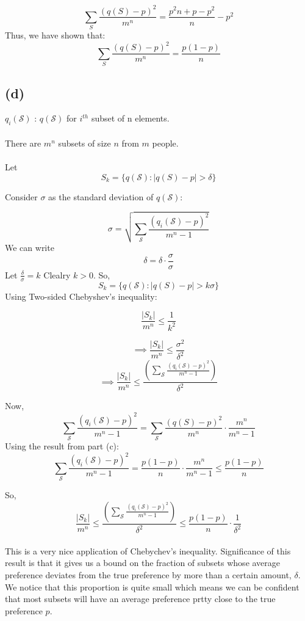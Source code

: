 \documentclass{report}
\begin{document}
\[\sum_{S} \frac{\left(q(S) - p\right)^{2}}{m^{n}} = \frac{p^2n + p -p^2}{n} - p^2\]
Thus, we have shown that:
\[\sum_{S} \frac{\left(q(S) - p\right)^{2}}{m^{n}} = \frac{p(1-p)}{n}\]

\subsection*{(d)}
\(q_i(\mathcal{S})\) : \(q(\mathcal{S})\) for \(i^{th}\) subset of n elements.
\\\\
There are \(m^n\) subsets of size \(n\) from \(m\) people.
\\\\
Let 
\[S_k = \{q(\mathcal{S})  : |q(S)-p| > \delta \}\]

Consider $\sigma$ as the standard deviation of \(q(\mathcal{S})\):

\[\sigma = \sqrt{\sum_{\mathcal{S}} \frac{(q_i(\mathcal{S}) - p)^{2}}{m^{n}-1}}\]
We can write 
\[\delta = \delta \cdot \frac{\sigma}{\sigma}\]
Let \(\frac{\delta}{\sigma} = k\) Clealry \( k >  0\). So,
\[S_k = \{q(\mathcal{S})  : |q(S)-p| > k\sigma \}\]
Using Two-sided Chebyshev's inequality:

\[\frac{|S_k|}{m^n}  \leq  \frac{1}{k^2}\]

\[\implies \frac{|S_k|}{m^n}  \leq  \frac{\sigma ^ 2}{\delta^2}\]
\[\implies \frac{|S_k|}{m^n}  \leq  \frac{({\sum_{\mathcal{S}} \frac{(q_i(\mathcal{S}) - p)^{2}}{m^{n}-1}}) }{\delta^2}\]

Now,
\[\sum_{\mathcal{S}} \frac{(q_i(\mathcal{S}) - p)^{2}}{m^{n}-1} = \sum_{\mathcal{S}} \frac{\left(q(S) - p\right)^{2}}{m^{n}} \cdot {\frac{m^n}{m^n -1}}\]
Using the result from part (c):
\[\sum_{\mathcal{S}} \frac{(q_i(\mathcal{S}) - p)^{2}}{m^{n}-1} =\frac{p(1-p)}{n} \cdot {\frac{m^n}{m^n -1}} \leq {\frac{p(1-p)}{n}}\]

So,
\[\frac{|S_k|}{m^n}  \leq  \frac{({\sum_{\mathcal{S}} \frac{(q_i(\mathcal{S}) - p)^{2}}{m^{n}-1}}) }{\delta^2}\leq {\frac{p(1-p)}{n}} \cdot \frac{1}{\delta^2}\]\\

This is a very nice application of Chebychev's inequality.
Significance of this result is that it gives us a bound on the fraction of subsets whose average preference deviates from the true preference by more than a certain amount, \(\delta\).
We notice that this proportion is quite small which means we can be confident that most subsets will have an average preference prtty close to the true preference \(p\).
\end{document}
